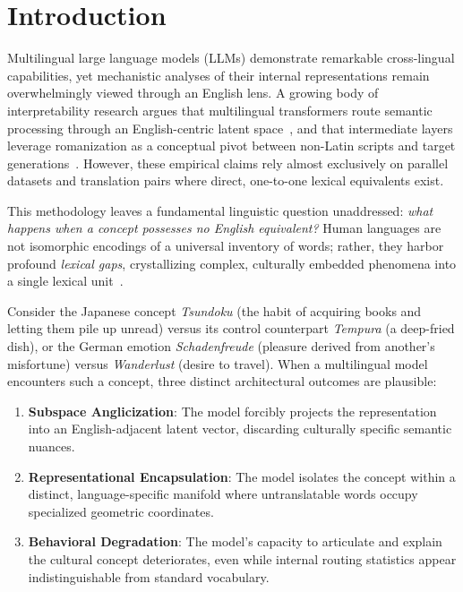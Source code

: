 \documentclass{article}
\begin{document}
\section{Introduction}

Multilingual large language models (LLMs) demonstrate remarkable cross-lingual capabilities, yet mechanistic analyses of their internal representations remain overwhelmingly viewed through an English lens. A growing body of interpretability research argues that multilingual transformers route semantic processing through an English-centric latent space~\cite{schut2025think,wendler2024llamas}, and that intermediate layers leverage romanization as a conceptual pivot between non-Latin scripts and target generations~\cite{saji2025romanlens}. However, these empirical claims rely almost exclusively on parallel datasets and translation pairs where direct, one-to-one lexical equivalents exist.

This methodology leaves a fundamental linguistic question unaddressed: \emph{what happens when a concept possesses no English equivalent?} Human languages are not isomorphic encodings of a universal inventory of words; rather, they harbor profound \emph{lexical gaps}, crystallizing complex, culturally embedded phenomena into a single lexical unit~\cite{sapir1929,brown1954study}.

Consider the Japanese concept \textit{Tsundoku} (the habit of acquiring books and letting them pile up unread) versus its control counterpart \textit{Tempura} (a deep-fried dish), or the German emotion \textit{Schadenfreude} (pleasure derived from another's misfortune) versus \textit{Wanderlust} (desire to travel). When a multilingual model encounters such a concept, three distinct architectural outcomes are plausible:
\begin{enumerate}
    \item \textbf{Subspace Anglicization}: The model forcibly projects the representation into an English-adjacent latent vector, discarding culturally specific semantic nuances.
    \item \textbf{Representational Encapsulation}: The model isolates the concept within a distinct, language-specific manifold where untranslatable words occupy specialized geometric coordinates.
    \item \textbf{Behavioral Degradation}: The model's capacity to articulate and explain the cultural concept deteriorates, even while internal routing statistics appear indistinguishable from standard vocabulary.
\end{enumerate}
\end{document}
